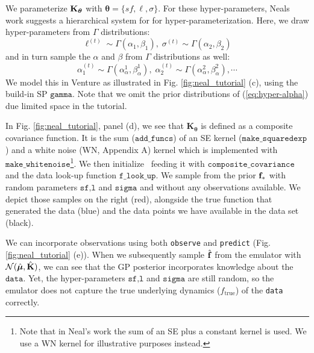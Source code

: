 We parameterize $\mathbf{K}_{\bm{\theta}}$ with $\bm{\theta}=\{sf,\ell,\sigma\}$.
For these hyper-parameters, Neals work suggests a hierarchical system for
for hyper-parameterization.
Here, we draw hyper-parameters from $\Gamma$ distributions:
\begin{equation}
\label{eq:hyper-ell}
\ell^{(t)} \sim \Gamma(\alpha_1,\beta_1),\;\sigma^{(t)} \sim \Gamma(\alpha_2,\beta_2)
\end{equation} 
and in turn sample the $\alpha$ and $\beta$ from $\Gamma$ distributions as well:
\begin{equation}
\label{eq:hyper-alpha}
\alpha_1^{(t)} \sim \Gamma(\alpha^1_{\alpha},\beta^1_{ \alpha } ),\; \alpha_2^{(t)} \sim \Gamma(\alpha^2_{\alpha},\beta^2_{\alpha}),\cdots
\end{equation}
We model this in Venture as illustrated in Fig. \ref{fig:neal_tutorial} (c),
using the build-in \ac{SP} $\texttt{gamma}$. Note that we omit the prior distributions of (\ref{eq:hyper-alpha}) due limited space in the tutorial.

In Fig. \ref{fig:neal_tutorial}, panel (d), we see that $\mathbf{K}_{\bm{\theta}}$
is defined as a composite covariance function. It is the sum ($\texttt{add\_funcs}$) of
an SE kernel ($\texttt{make\_squaredexp}$) and a white noise (WN, Appendix A)
kernel which is implemented with $\texttt{make\_whitenoise}$\footnote{Note
that in Neal's work \citeyearpar{neal1997monte} the sum of an SE
plus a constant kernel is used. We use a WN kernel for illustrative purposes
instead.}. 
We then initialize \gpmem\ feeding it with $\texttt{composite\_covariance}$ and the data
look-up function $\texttt{f\_look\_up}$. 
We sample from the prior $\mathbf{f}_*$ with random parameters $\texttt{sf,l}$ and $\texttt{sigma}$ and 
without any observations available.
We depict those samples on the right (red), alongside the true function that generated the data (blue) and
the data points we have available in the data set (black).

We can incorporate observations using both \texttt{observe} and \texttt{predict} (Fig. \ref{fig:neal_tutorial} (e)).
When we subsequently sample $\hat{\mathbf{f}}$ from the emulator with
$\mathcal{N}(\hat{\bm{\mu}},\hat{\mathbf{K}})$, we can see that the \ac{GP} posterior incorporates knowledge 
about the $\texttt{data}$. Yet, the hyper-parameters $\texttt{sf,l}$ and $\texttt{sigma}$ are still
random, so the emulator does not capture the true underlying dynamics
($f_\text{true}$) of the \texttt{data} correctly. 


